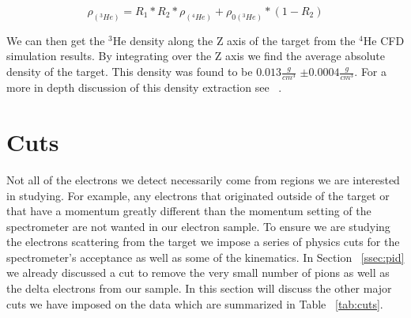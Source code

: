 \begin{equation} \label{eq:3he_density}
	\rho_{\left(^3He\right)} = R_1 * R_2 * \rho_{\left(^4He\right)} + \rho_{0\left(^3He\right)} * (1-R_2)
\end{equation}

\noindent We can then get the $^3$He density along the Z axis of the target from the $^4$He CFD simulation results. By integrating over the Z axis we find the average absolute density of the target. This density was found to be $0.013 \frac{g}{cm^3}$ $\pm 0.0004 \frac{g}{cm^3}$. For a more in depth discussion of this density extraction see ~\cite{density}.



\section{Cuts}
\label{sec:cuts}

Not all of the electrons we detect necessarily come from regions we are interested in studying. For example, any electrons that originated outside of the target or that have a momentum greatly different than the momentum setting of the spectrometer are not wanted in our electron sample. To ensure we are studying the electrons scattering from the target we impose a series of physics cuts for the spectrometer's acceptance as well as some of the kinematics. In Section ~\ref{ssec:pid} we already discussed a cut to remove the very small number of pions as well as the delta electrons from our sample. In this section will discuss the other major cuts we have imposed on the data which are summarized in Table ~\ref{tab:cuts}. 

